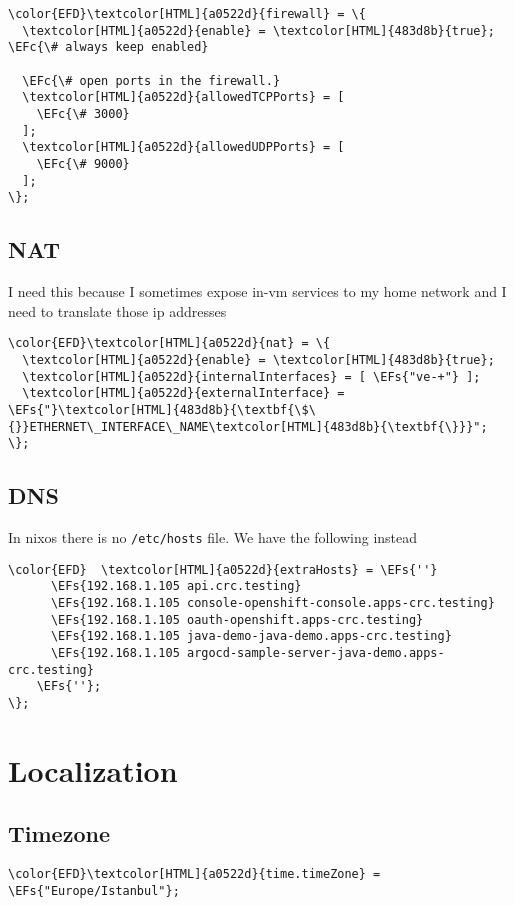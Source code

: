 \documentclass[14pt]{article}
\newcommand{\EFc}[1]{\textcolor{EFc}{#1}} %
\newcommand{\EFs}[1]{\textcolor{EFs}{#1}} %
\begin{document}
\begin{Code}
\begin{Verbatim}
\color{EFD}\textcolor[HTML]{a0522d}{firewall} = \{
  \textcolor[HTML]{a0522d}{enable} = \textcolor[HTML]{483d8b}{true}; \EFc{\# always keep enabled}

  \EFc{\# open ports in the firewall.}
  \textcolor[HTML]{a0522d}{allowedTCPPorts} = [
    \EFc{\# 3000}
  ];
  \textcolor[HTML]{a0522d}{allowedUDPPorts} = [
    \EFc{\# 9000}
  ];
\};
\end{Verbatim}
\end{Code}
\subsection{NAT}
\label{sec:org93784f7}
I need this because I sometimes expose in-vm services to my home network and I need to translate those ip addresses
\begin{Code}
\begin{Verbatim}
\color{EFD}\textcolor[HTML]{a0522d}{nat} = \{
  \textcolor[HTML]{a0522d}{enable} = \textcolor[HTML]{483d8b}{true};
  \textcolor[HTML]{a0522d}{internalInterfaces} = [ \EFs{"ve-+"} ];
  \textcolor[HTML]{a0522d}{externalInterface} = \EFs{"}\textcolor[HTML]{483d8b}{\textbf{\$\{}}ETHERNET\_INTERFACE\_NAME\textcolor[HTML]{483d8b}{\textbf{\}}}";
\};
\end{Verbatim}
\end{Code}
\subsection{DNS}
\label{sec:org843aa10}
In nixos there is no \texttt{/etc/hosts} file. We have the following instead
\begin{Code}
\begin{Verbatim}
\color{EFD}  \textcolor[HTML]{a0522d}{extraHosts} = \EFs{''}
      \EFs{192.168.1.105 api.crc.testing}
      \EFs{192.168.1.105 console-openshift-console.apps-crc.testing}
      \EFs{192.168.1.105 oauth-openshift.apps-crc.testing}
      \EFs{192.168.1.105 java-demo-java-demo.apps-crc.testing}
      \EFs{192.168.1.105 argocd-sample-server-java-demo.apps-crc.testing}
    \EFs{''};
\};
\end{Verbatim}
\end{Code}
\section{Localization}
\label{sec:org299e371}
\subsection{Timezone}
\label{sec:org01210ca}
\begin{Code}
\begin{Verbatim}
\color{EFD}\textcolor[HTML]{a0522d}{time.timeZone} = \EFs{"Europe/Istanbul"};
\end{Verbatim}
\end{Code}
\end{document}
